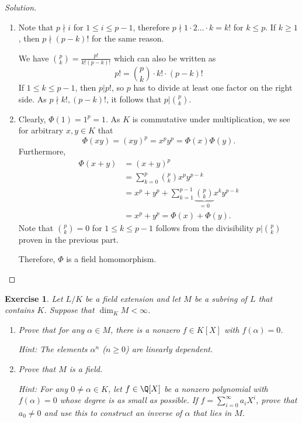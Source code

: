 \documentclass[a4paper,10pt,reqno]{amsart}
\newtheorem{ex}{Exercise}[section]
\newenvironment{sol}
  {\renewcommand\qedsymbol{$\blacksquare$}\begin{proof}[Solution]}
  {\end{proof}}
\begin{document}
\begin{sol}~

    \begin{enumerate}[label=(\roman*)]
        \item Note that $p \nmid i$ for $1 \leq i \leq p-1$, therefore $p \nmid 1 \cdot 2 \ldots \cdot k = k!$ for $k \leq p$. If $k \geq 1$, then $p \nmid (p-k)!$ for the same reason.

        We have $\binom{p}{k} = \frac{p!}{k!(p-k)!}$ which can also be written as
        \[
        p! = \binom{p}{k} \cdot k! \cdot (p-k)!
        \]
        If $1 \leq k \leq p-1$, then $p|p!$, so $p$ has to divide at least one factor on the right side. As $p \nmid k!,(p-k)!$, it follows that $p | \binom{p}{k}$.

        \item Clearly, $\Phi(1) = 1^p = 1$. As $K$ is commutative under multiplication, we see for arbitrary $x,y \in K$ that
        \[
        \Phi(xy) = (xy)^p = x^py^p = \Phi(x) \Phi(y).
        \]
        Furthermore,
        \begin{align*}
            \Phi(x+y) & = (x+y)^p \\
            & = \sum_{k=0}^p \binom{p}{k}x^py^{p-k} \\
            & = x^p + y^p + \sum_{k=1}^{p-1} \underbrace{\binom{p}{k}}_{=0}x^ky^{p-k} \\
            & = x^p + y^p = \Phi(x) + \Phi(y).
        \end{align*}
        Note that $\binom{p}{k} = 0$ for $1 \leq k \leq p-1$ follows from the divisibility $p | \binom{p}{k}$ proven in the previous part.

        Therefore, $\Phi$ is a field homomorphism.
    \end{enumerate}
\end{sol}

\begin{ex}
\label{1.6}
    Let $L/K$ be a field extension and let $M$ be a subring of $L$ that contains $K$. Suppose that $\dim_KM < \infty$.
    \begin{enumerate}[label=(\roman*)]
        \item Prove that for any $\alpha \in M$, there is a nonzero $f \in K[X]$ with $f(\alpha) = 0$.

        \noindent \textit{Hint:} The elements $\alpha^n$ ($n \geq 0$) are linearly dependent.
        
        \item Prove that $M$ is a field.
        
        \noindent \textit{Hint:} For any $0 \neq \alpha \in K$, let $f \in \Q[X]$ be a nonzero polynomial with $f(\alpha) = 0$ whose degree is as small as possible. If $f = \sum_{i=0}^{\infty} a_iX^i$, prove that $a_0 \neq 0$ and use this to construct an inverse of $\alpha$ that lies in $M$.
    \end{enumerate}
\end{ex}
\end{document}
